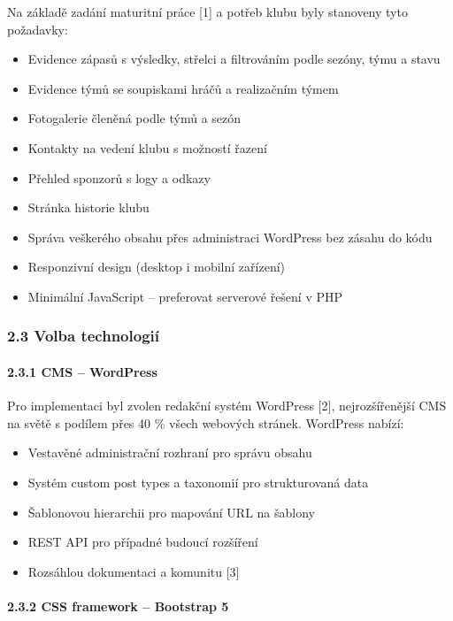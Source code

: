 Na základě zadání maturitní práce {[}1{]} a potřeb klubu byly stanoveny
tyto požadavky:

\begin{itemize}
\tightlist
\item
  Evidence zápasů s výsledky, střelci a filtrováním podle sezóny, týmu a
  stavu
\item
  Evidence týmů se soupiskami hráčů a realizačním týmem
\item
  Fotogalerie členěná podle týmů a sezón
\item
  Kontakty na vedení klubu s možností řazení
\item
  Přehled sponzorů s logy a odkazy
\item
  Stránka historie klubu
\item
  Správa veškerého obsahu přes administraci WordPress bez zásahu do kódu
\item
  Responzivní design (desktop i mobilní zařízení)
\item
  Minimální JavaScript -- preferovat serverové řešení v PHP
\end{itemize}

\subsubsection{2.3 Volba technologií}\label{volba-technologiuxed}

\paragraph{2.3.1 CMS -- WordPress}\label{cms-wordpress}

Pro implementaci byl zvolen redakční systém WordPress {[}2{]},
nejrozšířenější CMS na světě s podílem přes 40 \% všech webových
stránek. WordPress nabízí:

\begin{itemize}
\tightlist
\item
  Vestavěné administrační rozhraní pro správu obsahu
\item
  Systém custom post types a taxonomií pro strukturovaná data
\item
  Šablonovou hierarchii pro mapování URL na šablony
\item
  REST API pro případné budoucí rozšíření
\item
  Rozsáhlou dokumentaci a komunitu {[}3{]}
\end{itemize}

\paragraph{2.3.2 CSS framework -- Bootstrap
5}\label{css-framework-bootstrap-5}

